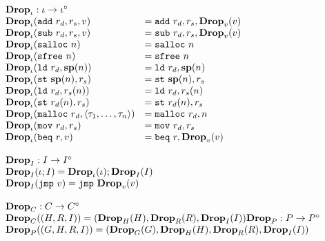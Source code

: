 {\[\begin{array}{l}
\begin{array}{ll}
\rlap{$\mathbf{Drop}_\iota : \iota -> \iota^\circ$} \\
\drop{\iota}{\mathtt{add}\ r_d, r_s, v} &= \mathtt{add}\ r_d, r_s, \drop{v}{v} \\
\drop{\iota}{\mathtt{sub}\ r_d, r_s, v} &= \mathtt{sub}\ r_d, r_s, \drop{v}{v} \\
\drop{\iota}{\mathtt{salloc}\ n} &= \mathtt{salloc}\ n \\
\drop{\iota}{\mathtt{sfree}\ n} &= \mathtt{sfree}\ n \\
\drop{\iota}{\mathtt{ld}\ r_d, \mathbf{sp}(n)} &= \mathtt{ld}\ r_d, \mathbf{sp}(n) \\
\drop{\iota}{\mathtt{st}\ \mathbf{sp}(n), r_s} &= \mathtt{st}\ \mathbf{sp}(n), r_s \\
\drop{\iota}{\mathtt{ld}\ r_d, r_s(n)} &= \mathtt{ld}\ r_d, r_s(n) \\
\drop{\iota}{\mathtt{st}\ r_d(n), r_s} &= \mathtt{st}\ r_d(n), r_s \\
\drop{\iota}{\mathtt{malloc}\ r_d, \langle \tau_1, \dots, \tau_n \rangle} &= \mathtt{malloc}\ r_d, n \\
\drop{\iota}{\mathtt{mov}\ r_d, r_s} &= \mathtt{mov}\ r_d, r_s \\
\drop{\iota}{\mathtt{beq}\ r, v} &= \mathtt{beq}\ r, \drop{v}{v} \\
\end{array} \\\\

\begin{array}{l}
\mathbf{Drop}_I : I -> I^\circ \\
\drop{I}{\iota ; I} = \drop{\iota}{\iota} ; \drop{I}{I} \\
\drop{I}{\mathtt{jmp}\ v} = \mathtt{jmp}\ \drop{v}{v} \\\\

\mathbf{Drop}_C : C -> C^\circ \\
\drop{C}{(H, R, I)} = (\drop{H}{H}, \drop{R}{R}, \drop{I}{I})

\mathbf{Drop}_P : P -> P^\circ \\
\drop{P}{(G, H, R, I)} = (\drop{G}{G}, \drop{H}{H}, \drop{R}{R}, \drop{I}{I})
\end{array} \\\\

\end{array}\]
}
